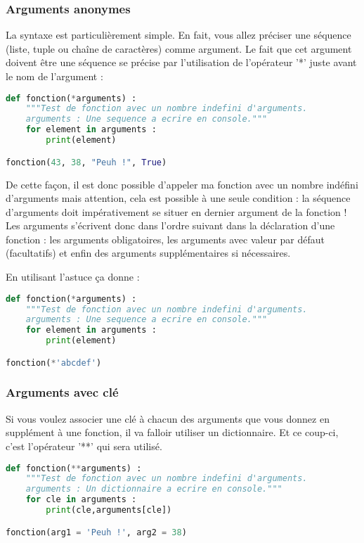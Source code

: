 \documentclass[a4paper,twoside]{article}
\begin{document}
\subsubsection{Arguments anonymes}

La syntaxe est particulièrement simple. En fait, vous allez préciser une séquence (liste, tuple ou chaîne de caractères) comme argument. Le fait que cet argument doivent être une séquence se précise par l'utilisation de l'opérateur '*' juste avant le nom de l'argument :

\begin{lstlisting}[language=python]
def fonction(*arguments) :
    """Test de fonction avec un nombre indefini d'arguments.
    arguments : Une sequence a ecrire en console."""
    for element in arguments :
        print(element)

fonction(43, 38, "Peuh !", True)
\end{lstlisting}

De cette façon, il est donc possible d'appeler ma fonction avec un nombre indéfini d'arguments mais attention, cela est possible à une seule condition : la séquence d'arguments doit impérativement se situer en dernier argument de la fonction ! Les arguments s'écrivent donc dans l'ordre suivant dans la déclaration d'une fonction : les arguments obligatoires, les arguments avec valeur par défaut (facultatifs) et enfin des arguments supplémentaires si nécessaires.

En utilisant l'astuce  ça donne :
\begin{lstlisting}[language=python]
def fonction(*arguments) :
    """Test de fonction avec un nombre indefini d'arguments.
    arguments : Une sequence a ecrire en console."""
    for element in arguments :
        print(element)

fonction(*'abcdef')
\end{lstlisting}

\subsubsection{Arguments avec clé}

Si vous voulez associer une clé à chacun des arguments que vous donnez en supplément à une fonction, il va falloir utiliser un dictionnaire. Et ce coup-ci, c'est l'opérateur '**' qui sera utilisé.

\begin{lstlisting}[language=python]
def fonction(**arguments) :
    """Test de fonction avec un nombre indefini d'arguments.
    arguments : Un dictionnaire a ecrire en console."""
    for cle in arguments :
        print(cle,arguments[cle])

fonction(arg1 = 'Peuh !', arg2 = 38)
\end{lstlisting}
\end{document}
